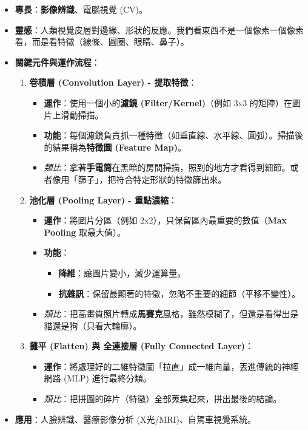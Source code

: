 \documentclass[
  letterpaper,
  DIV=11,
  numbers=noendperiod]{scrreprt}
\providecommand{\tightlist}{%
  \setlength{\itemsep}{0pt}\setlength{\parskip}{0pt}}
\begin{document}
\begin{itemize}
\tightlist
\item
  \textbf{專長}：\textbf{影像辨識}、電腦視覺 (CV)。
\item
  \textbf{靈感}：人類視覺皮層對邊緣、形狀的反應。我們看東西不是一個像素一個像素看，而是看特徵（線條、圓圈、眼睛、鼻子）。
\item
  \textbf{關鍵元件與運作流程}：

  \begin{enumerate}
  \def\labelenumi{\arabic{enumi}.}
  \tightlist
  \item
    \textbf{卷積層 (Convolution Layer) - 提取特徵}：

    \begin{itemize}
    \tightlist
    \item
      \textbf{運作}：使用一個小的\textbf{濾鏡 (Filter/Kernel)}（例如 3x3
      的矩陣）在圖片上滑動掃描。
    \item
      \textbf{功能}：每個濾鏡負責抓一種特徵（如垂直線、水平線、圓弧）。掃描後的結果稱為\textbf{特徵圖
      (Feature Map)}。
    \item
      \emph{類比}：拿著\textbf{手電筒}在黑暗的房間掃描，照到的地方才看得到細節。或者像用「篩子」，把符合特定形狀的特徵篩出來。
    \end{itemize}
  \item
    \textbf{池化層 (Pooling Layer) - 重點濃縮}：

    \begin{itemize}
    \tightlist
    \item
      \textbf{運作}：將圖片分區（例如
      2x2），只保留區內最重要的數值（\textbf{Max Pooling} 取最大值）。
    \item
      \textbf{功能}：

      \begin{itemize}
      \tightlist
      \item
        \textbf{降維}：讓圖片變小，減少運算量。
      \item
        \textbf{抗雜訊}：保留最顯著的特徵，忽略不重要的細節（平移不變性）。
      \end{itemize}
    \item
      \emph{類比}：把高畫質照片轉成\textbf{馬賽克}風格，雖然模糊了，但還是看得出是貓還是狗（只看大輪廓）。
    \end{itemize}
  \item
    \textbf{攤平 (Flatten) 與 全連接層 (Fully Connected Layer)}：

    \begin{itemize}
    \tightlist
    \item
      \textbf{運作}：將處理好的二維特徵圖「拉直」成一維向量，丟進傳統的神經網路
      (MLP) 進行最終分類。
    \item
      \emph{類比}：把拼圖的碎片（特徵）全部蒐集起來，拼出最後的結論。
    \end{itemize}
  \end{enumerate}
\item
  \textbf{應用}：人臉辨識、醫療影像分析 (X光/MRI)、自駕車視覺系統。
\end{itemize}
\end{document}
